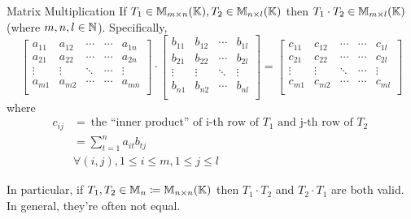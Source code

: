 \begin{definition} {Matrix Multiplication}
    If \(T_1 \in \mathbb{M}_{m\times n}(\mathbb{K}), T_2 \in \mathbb{M}_{n\times l}(\mathbb{K})\) then \(T_1 \cdot T_2 \in \mathbb{M}_{m\times l}(\mathbb{K})\) (where \(m, n, l \in \mathbb{N}\)). Specifically, \[
        \left[
            \begin{array}{ccccc}
                a_{11} & a_{12} & \cdots & \cdots & a_{1n} \\
                a_{21} & a_{22} & \cdots & \cdots & a_{2n} \\
                \vdots & \vdots & \ddots & \cdots & \vdots \\
                a_{m1} & a_{m2} & \cdots & \cdots & a_{mn} \\
            \end{array}
            \right] \cdot
        \left[
            \begin{array}{cccc}
                b_{11} & b_{12} & \cdots & b_{1l} \\
                b_{21} & b_{22} & \cdots & b_{2l} \\
                \vdots & \vdots & \ddots & \vdots \\
                b_{n1} & b_{n2} & \cdots & b_{nl} \\
            \end{array}
            \right] =
        \left[
            \begin{array}{ccccc}
                c_{11} & c_{12} & \cdots & \cdots & c_{1l} \\
                c_{21} & c_{22} & \cdots & \cdots & c_{2l} \\
                \vdots & \vdots & \ddots & \cdots & \vdots \\
                c_{m1} & c_{m2} & \cdots & \cdots & c_{ml} \\
            \end{array}
            \right]
    \]
    where
    \begin{align*}
        c_{ij} & = \:\text{the ``inner product'' of i-th row of \(T_1\) and j-th row of \(T_2\)}\: \\
               & = \sum_{t=1}^n a_{it}b_{tj}                                                       \\
               & \forall (i, j), 1 \leq i \leq m, 1 \leq j \leq l
    \end{align*}
\end{definition}

In particular, if \(T_1, T_2 \in \mathbb{M}_n \coloneqq \mathbb{M}_{n\times n}(\mathbb{K}) \) then \(T_1 \cdot T_2\) and \(T_2 \cdot T_1\) are both valid. In general, they're often not equal.

